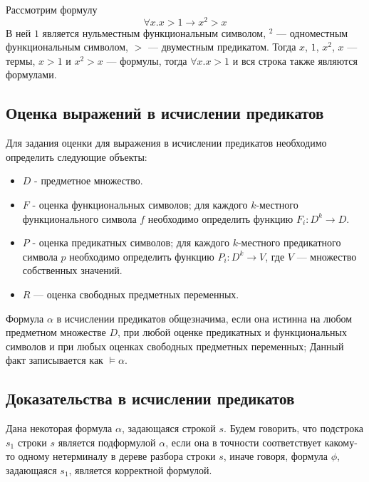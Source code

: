 \begin{example}
Рассмотрим формулу $$\forall x. x > 1 \rightarrow x^2 > x$$ В ней $1$ является нульместным функциональным символом, $^2$ --- одноместным функциональным символом, $>$ --- двуместным предикатом. Тогда $x$, $1$, $x^2$, $x$ --- термы, $x > 1$ и $x^2 > x$ --- формулы, тогда $\forall x. x > 1$ и вся строка также являются формулами.
\end{example}

\subsection{Оценка выражений в исчислении предикатов}

Для задания оценки для выражения в исчислении предикатов необходимо определить следующие объекты:
\begin{itemize}
    \item $D$ - предметное множество.
    \item $F$ - оценка функциональных символов; для каждого $k$-местного функционального символа $f$ необходимо определить функцию $F_i: D^k \rightarrow D$.
    \item $P$ - оценка предикатных символов; для каждого $k$-местного предикатного символа $p$ необходимо определить функцию $P_i: D^k \rightarrow V$, где $V$ --- множество собственных значений.
    \item $R$ --- оценка свободных предметных переменных.
\end{itemize}

\begin{definition}Формула $\alpha$ в исчислении предикатов общезначима, если она
истинна на любом предметном множестве $D$, при любой оценке предикатных
и функциональных символов и при любых оценках свободных предметных
переменных; Данный факт записывается как $\models \alpha$.
\end{definition}


\subsection{Доказательства в исчислении предикатов}

\begin{definition}Дана некоторая формула $\alpha$, задающаяся строкой $s$.
Будем говорить, что подстрока $s_1$ строки $s$ является подформулой $\alpha$, 
если она в точности соответствует какому-то одному нетерминалу
в дереве разбора строки $s$, иначе говоря, формула $\phi$, задающаяся $s_1$, является корректной формулой.
\end{definition}

